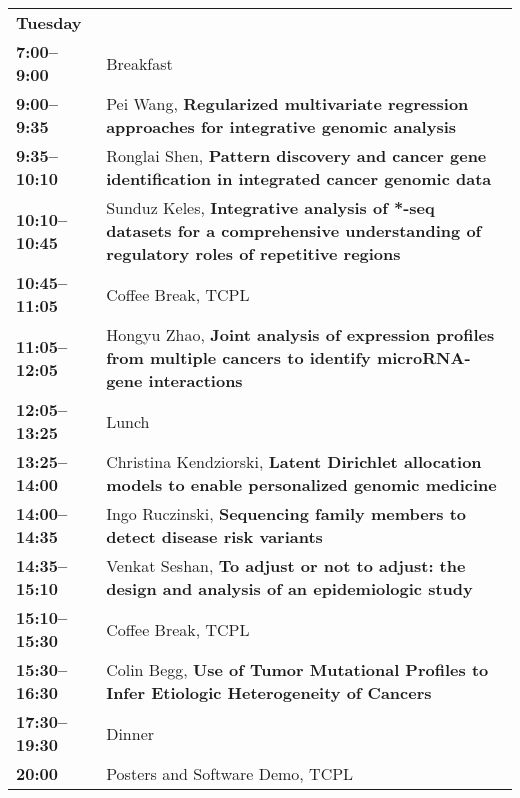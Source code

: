 \documentclass[11pt]{article}
\begin{document}
\begin{tabular}{ p{1in} p{5.8in} } 
{\bf\large Tuesday} & \\

{\bf 7:00--9:00}  & Breakfast\\
{\bf 9:00--9:35}  &  Pei Wang, {\bf Regularized multivariate regression approaches for integrative genomic analysis}\\
{\bf 9:35--10:10}  &  Ronglai Shen, {\bf Pattern discovery and cancer gene identification in integrated cancer genomic data}\\
{\bf 10:10--10:45}  &  Sunduz Keles, {\bf Integrative analysis of *-seq datasets for a comprehensive understanding of regulatory roles of repetitive regions}\\
{\bf 10:45--11:05} & Coffee Break, TCPL\\
{\bf 11:05--12:05}  & Hongyu Zhao, {\bf Joint analysis of expression profiles from multiple cancers to identify microRNA-gene interactions}\\
{\bf 12:05--13:25}& Lunch\\
{\bf 13:25--14:00}  &  Christina Kendziorski, {\bf Latent Dirichlet allocation models to enable personalized genomic medicine}\\
{\bf 14:00--14:35}  &  Ingo Ruczinski, {\bf Sequencing family members to detect disease risk variants}\\
{\bf 14:35--15:10}  &  Venkat Seshan, {\bf To adjust or not to adjust: the design and analysis of an epidemiologic study}\\
{\bf 15:10--15:30} & Coffee Break, TCPL\\
{\bf 15:30--16:30}  &  Colin Begg, {\bf Use of Tumor Mutational Profiles to Infer Etiologic Heterogeneity of Cancers}\\
{\bf 17:30--19:30} & Dinner\\
{\bf 20:00}  & Posters and Software Demo, TCPL\\
\end{tabular}
\end{document}
